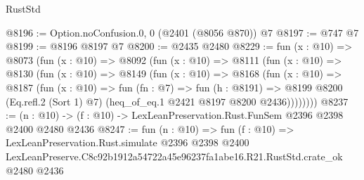 \begin{lexlean}{RustStd}
\begin{coremodule}
@8196 := Option.noConfusion.{0, 0} (@2401 (@8056 @870)) @7
@8197 := @747 @7
@8199 := @8196 @8197 @7
@8200 := @2435 @2480
@8229 := fun (x : @10) =>
  @8073
    (fun (x : @10) =>
    @8092
      (fun (x : @10) =>
      @8111
        (fun (x : @10) =>
        @8130
          (fun (x : @10) =>
          @8149
            (fun (x : @10) =>
            @8168
              (fun (x : @10) =>
              @8187
                (fun (x : @10) =>
                fun (fn : @7) =>
                fun (h : @8191) =>
                @8199 @8200 (Eq.refl.{2} (Sort 1) @7) (heq_of_eq.{1} @2421 @8197 @8200 @2436))))))))
@8237 := (n : @10) -> (f : @10) -> LexLeanPreservation.Rust.FunSem @2396 @2398 @2400 @2480 @2436
@8247 := fun (n : @10) =>
  fun (f : @10) =>
  LexLeanPreservation.Rust.simulate
    @2396
    @2398
    @2400
    LexLeanPreserve.C8c92b1912a54722a45e96237fa1abe16.R21.RustStd.crate_ok
    @2480
    @2436
\end{coremodule}
\end{lexlean}
